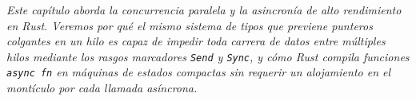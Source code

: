 \documentclass{book}
\begin{document}
\noindent\textit{Este capítulo aborda la concurrencia paralela y la asincronía de alto rendimiento en Rust. Veremos por qué el mismo sistema de tipos que previene punteros colgantes en un hilo es capaz de impedir toda carrera de datos entre múltiples hilos mediante los rasgos marcadores \texttt{Send} y \texttt{Sync}, y cómo Rust compila funciones \texttt{async fn} en máquinas de estados compactas sin requerir un alojamiento en el montículo por cada llamada asíncrona.}

\par\vspace{\baselineskip}
\end{document}
